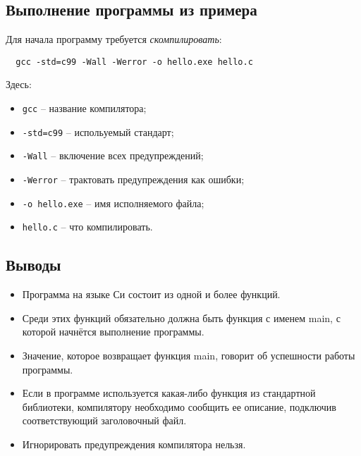 \subsection{Выполнение программы из примера}

Для начала программу требуется \textit{скомпилировать}:

\begin{verbatim}
  gcc -std=c99 -Wall -Werror -o hello.exe hello.c
\end{verbatim}

Здесь:
\begin{itemize}
  \item \texttt{gcc} -- название компилятора;
  \item \texttt{-std=c99} -- испольуемый стандарт;
  \item \texttt{-Wall} -- включение всех предупреждений;
  \item \texttt{-Werror} -- трактовать предупреждения как ошибки;
  \item \texttt{-o hello.exe} -- имя исполняемого файла;
  \item \texttt{hello.c} -- что компилировать.
\end{itemize}

\subsection{Выводы}

\begin{itemize}
  \item Программа на языке Си состоит из одной и более функций.
  \item Среди этих функций обязательно должна быть функция с именем main, с которой начнётся выполнение программы.
  \item Значение, которое возвращает функция main, говорит об успешности работы программы.
  \item Если в программе используется какая-либо функция из стандартной библиотеки, компилятору необходимо сообщить ее описание, подключив соответствующий заголовочный файл.
  \item Игнорировать предупреждения компилятора нельзя.
\end{itemize}




